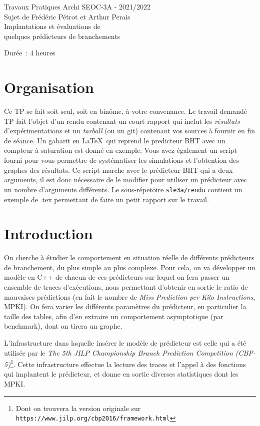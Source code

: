\documentclass[a4paper]{article}
\begin{document}
\begin{center}
\large
Travaux Pratiques Archi SEOC-3A - 2021/2022\\
Sujet de Frédéric Pétrot et Arthur Perais\\
\LARGE
Implantations et évaluations de\\
quelques prédicteurs de branchements\\
\large

Durée~: 4 heures
\end{center}
\section{Organisation}
Ce TP se fait soit seul, soit en binôme, à votre convenance.
Le travail demandé TP fait l'objet d'un rendu contenant un court rapport qui inclut les \emph{résultats} d'expérimentations et un \emph{tarball} (ou un git) contenant vos sources à fournir en fin de séance.
Un gabarit en \LaTeX\ qui reprend le predicteur BHT avec un compteur à saturation est donné en exemple.
Vous avez également un script fourni pour vous permettre de systématiser les simulations et l'obtention des graphes des résultats.
Ce script marche avec le prédicteur BHT qui a deux arguments, il est donc nécessaire de le modifier pour utiliser un prédicteur avec un nombre d'arguments différents.
Le sous-répetoire \verb+sle3a/rendu+ contient un exemple de .tex permettant de faire un petit rapport sur le travail.

\section{Introduction}
On cherche à étudier le comportement en situation réelle de différents prédicteurs de branchement, du plus simple au plus complexe. Pour cela, on va développer un modèle en C++ de chacun de ces prédicteurs sur lequel on fera passer un ensemble de traces d'exécutions, nous permettant d'obtenir en sortie le ratio de mauvaises prédictions (en fait le nombre de \emph{Miss Prediction per Kilo Instructions}, MPKI). On fera varier les différents paramètres du prédicteur, en particulier la taille des tables, afin d'en extraire un comportement asymptotique (par benchmark), dont on tirera un graphe.

L'infrastructure dans laquelle insérer le modèle de prédicteur est celle qui a été utilisée par le \emph{The 5th JILP Championship Branch Prediction Competition (CBP-5)}\footnote{Dont on trouvera la version originale sur \texttt{https://www.jilp.org/cbp2016/framework.html}}.
Cette infrastructure effectue la lecture des traces et l'appel à des fonctions qui implantent le prédicteur, et donne en sortie diverses statistiques dont les MPKI.
\end{document}
